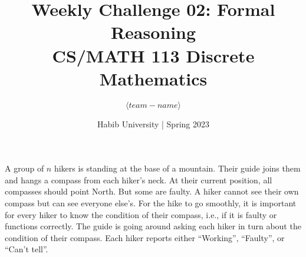 \documentclass[a4paper]{exam}
\title{Weekly Challenge 02: Formal Reasoning\\CS/MATH 113 Discrete Mathematics}
\author{$\langle team-name \rangle$}  %
\date{Habib University | Spring 2023}
\begin{document}
\maketitle

\begin{questions}
  
A group of $n$ hikers is standing at the base of a mountain. Their guide joins them and hangs a compass from each hiker's neck. At their current position, all compasses should point North. But some are faulty. A hiker cannot see their own compass but can see everyone else's. For the hike to go smoothly, it is important for every hiker to know the condition of their compass, i.e., if it is faulty or functions correctly. The guide is going around asking each hiker in turn about the condition of their compass. Each hiker reports either ``Working'', ``Faulty'', or ``Can't tell''.





\end{questions}
\end{document}
